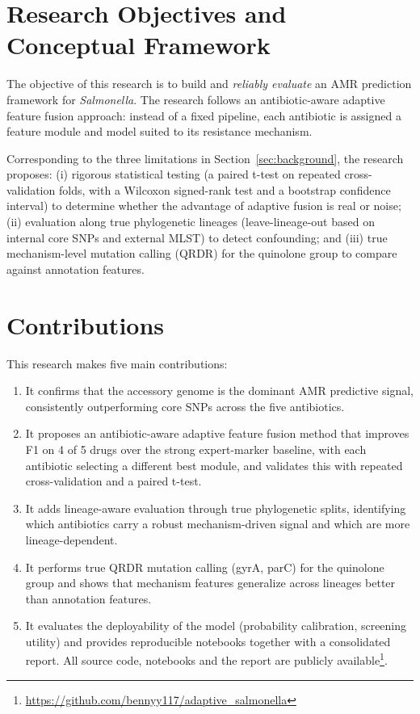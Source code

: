 \documentclass[../main.tex]{subfiles}
\begin{document}
\section{Research Objectives and Conceptual Framework}
\label{sec:objectives}

The objective of this research is to build and \textit{reliably evaluate} an AMR prediction framework for \textit{Salmonella}. The research follows an antibiotic-aware adaptive feature fusion approach: instead of a fixed pipeline, each antibiotic is assigned a feature module and model suited to its resistance mechanism.

Corresponding to the three limitations in Section~\ref{sec:background}, the research proposes: (i) rigorous statistical testing (a paired t-test on repeated cross-validation folds, with a Wilcoxon signed-rank test and a bootstrap confidence interval) to determine whether the advantage of adaptive fusion is real or noise; (ii) evaluation along true phylogenetic lineages (leave-lineage-out based on internal core SNPs and external \gls{MLST}) to detect confounding; and (iii) true mechanism-level mutation calling (\gls{QRDR}) for the quinolone group to compare against annotation features.

\section{Contributions}

This research makes five main contributions:

\begin{enumerate}
\item It confirms that the accessory genome is the dominant AMR predictive signal, consistently outperforming core SNPs across the five antibiotics.
\item It proposes an antibiotic-aware adaptive feature fusion method that improves F1 on 4 of 5 drugs over the strong expert-marker baseline, with each antibiotic selecting a different best module, and validates this with repeated cross-validation and a paired t-test.
\item It adds lineage-aware evaluation through true phylogenetic splits, identifying which antibiotics carry a robust mechanism-driven signal and which are more lineage-dependent.
\item It performs true QRDR mutation calling (gyrA, parC) for the quinolone group and shows that mechanism features generalize across lineages better than annotation features.
\item It evaluates the deployability of the model (probability calibration, screening utility) and provides reproducible notebooks together with a consolidated report. All source code, notebooks and the report are publicly available\footnote{\url{https://github.com/bennyy117/adaptive_salmonella}}.
\end{enumerate}
\end{document}
